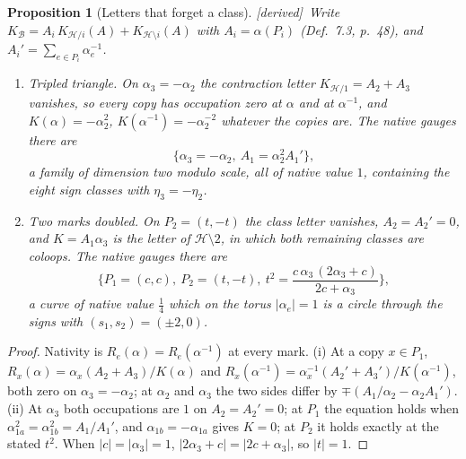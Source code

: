 \documentclass[11pt]{article}
\newcommand{\cB}{\mathcal B}
\newcommand{\cH}{\mathcal H}
\theoremstyle{plain}
\newtheorem{proposition}{Proposition}[section]
\theoremstyle{definition}
\theoremstyle{remark}
\newcommand{\derived}{\textup{[derived]}}
\begin{document}
\begin{proposition}[Letters that forget a class]\label{a:p:families}\derived\
Write $K_{\cB}=A_i\,K_{\cH/i}(A)+K_{\cH\setminus i}(A)$ with $A_i=\alpha(P_i)$ (Def.~7.3, p.~48), and $A_i'=\sum_{e\in P_i}\alpha_e^{-1}$.
\begin{enumerate}[label=(\roman*)]
\item Tripled triangle. On $\alpha_3=-\alpha_2$ the contraction letter $K_{\cH/1}=A_2+A_3$ vanishes, so every copy has occupation zero at $\alpha$ and at $\alpha^{-1}$, and $K(\alpha)=-\alpha_2^2$, $K(\alpha^{-1})=-\alpha_2^{-2}$ whatever the copies are. The native gauges there are
\[
\big\{\alpha_3=-\alpha_2,\ A_1=\alpha_2^2A_1'\big\},
\]
a family of dimension two modulo scale, all of native value $1$, containing the eight sign classes with $\eta_3=-\eta_2$.
\item Two marks doubled. On $P_2=(t,-t)$ the class letter vanishes, $A_2=A_2'=0$, and $K=A_1\alpha_3$ is the letter of $\cH\setminus2$, in which both remaining classes are coloops. The native gauges there are
\[
\Big\{P_1=(c,c),\ P_2=(t,-t),\ t^2=\frac{c\,\alpha_3\,(2\alpha_3+c)}{2c+\alpha_3}\Big\},
\]
a curve of native value $\frac14$ which on the torus $|\alpha_e|=1$ is a circle through the signs with $(s_1,s_2)=(\pm2,0)$.
\end{enumerate}
\end{proposition}

\begin{proof}
Nativity is $R_e(\alpha)=R_e(\alpha^{-1})$ at every mark. (i) At a copy $x\in P_1$, $R_x(\alpha)=\alpha_x(A_2+A_3)/K(\alpha)$ and $R_x(\alpha^{-1})=\alpha_x^{-1}(A_2'+A_3')/K(\alpha^{-1})$, both zero on $\alpha_3=-\alpha_2$; at $\alpha_2$ and $\alpha_3$ the two sides differ by $\mp(A_1/\alpha_2-\alpha_2A_1')$. (ii) At $\alpha_3$ both occupations are $1$ on $A_2=A_2'=0$; at $P_1$ the equation holds when $\alpha_{1a}^2=\alpha_{1b}^2=A_1/A_1'$, and $\alpha_{1b}=-\alpha_{1a}$ gives $K=0$; at $P_2$ it holds exactly at the stated $t^2$. When $|c|=|\alpha_3|=1$, $|2\alpha_3+c|=|2c+\alpha_3|$, so $|t|=1$.
\end{proof}
\end{document}
